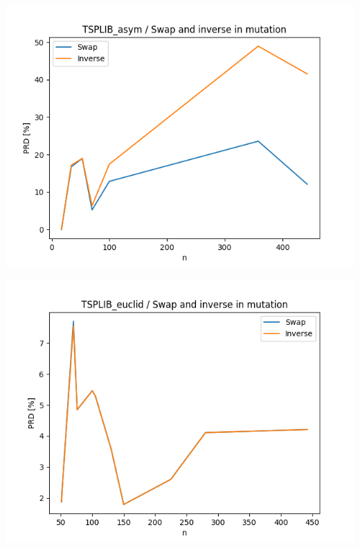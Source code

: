 \documentclass{article}
\begin{document}
\begin{center}
\includegraphics[width=\textwidth, 
                   height = 0.4\textheight, 
                   keepaspectratio]
                  {plots/tsplib_asym_6_swap_inverse} 
\end{center}

\begin{center}
\includegraphics[width=\textwidth, 
                   height = 0.4\textheight, 
                   keepaspectratio]
                  {plots/tsplib_euclid_6_swap_inverse} 
\end{center}
\end{document}
